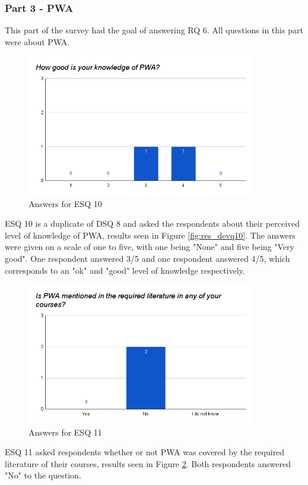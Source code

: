 \documentclass[a4paper,12pt]{article}
\begin{document}
\subsubsection{Part 3 - PWA}
\label{Results_edu_part3}
This part of the survey had the goal of answering RQ 6. All questions in this part were about PWA.

\begin{figure}[ht!]
    \centering
    \includegraphics[width=10cm]{img/Results/esq10.png}
    \caption{Answers for ESQ 10}
    \label{fig:res_eduq10}
\end{figure}

ESQ 10 is a duplicate of DSQ 8 and asked the respondents about their perceived level of knowledge of PWA, results seen in Figure \ref{fig:res_devq10}. The answers were given on a scale of one to five, with one being "None" and five being "Very good". One respondent answered 3/5 and one respondent answered 4/5, which corresponds to an "ok" and "good" level of knowledge respectively.

\begin{figure}[ht!]
    \centering
    \includegraphics[width=10cm]{img/Results/esq11.png}
    \caption{Answers for ESQ 11}
    \label{fig:res_eduq11}
\end{figure}

ESQ 11 asked respondents whether or not PWA was covered by the required literature of their courses, results seen in Figure \ref{fig:res_eduq11}. Both respondents answered "No" to the question.
\end{document}
